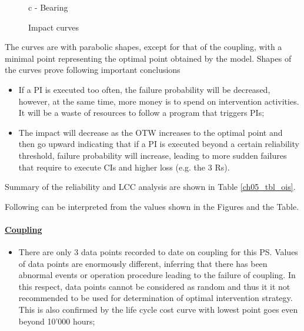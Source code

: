 \begin{figure}[!htb]
\begin{minipage}[b]{0.5\linewidth}
	\caption*{c - Bearing}
\end{minipage}
\caption{Impact curves}
\label{ch05_fig_ois}
\end{figure}

The curves are with parabolic shapes, except for that of the coupling, with a minimal point representing the optimal point obtained by the model. Shapes of the curves prove following important conclusions

\begin{itemize}
\item If a PI is executed too often, the failure probability will be decreased, however, at the same time, more money is to spend on intervention activities. It will be a waste of resources to follow a program that triggers PIs;
\item The impact will decrease as the OTW increases to the optimal point and then go upward indicating that if a PI is executed beyond a certain reliability threshold, failure probability will increase, leading to more sudden failures that require to execute CIs and higher loss (e.g. the 3 Rs).
\end{itemize}

Summary of the reliability and LCC analysis are shown in Table \ref{ch05_tbl_ois}.



Following can be interpreted from the values shown in the Figures and the Table.

\paragraph{\underline{Coupling}}

\begin{itemize}
\item There are only 3 data points recorded to date on coupling for this PS. Values of data points are enormously different, inferring that there has been abnormal events or operation procedure leading to the failure of coupling. In this respect, data points cannot be considered as random and thus it it not recommended to be used for determination of optimal intervention strategy. This is also confirmed by the life cycle cost curve with lowest point goes even beyond 10'000 hours;
\end{itemize}

